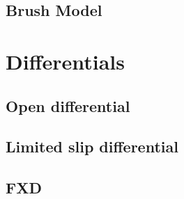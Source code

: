 \subsection{Brush Model}



\section{Differentials}

\subsection{Open differential}

\subsection{Limited slip differential}

\subsection{FXD}